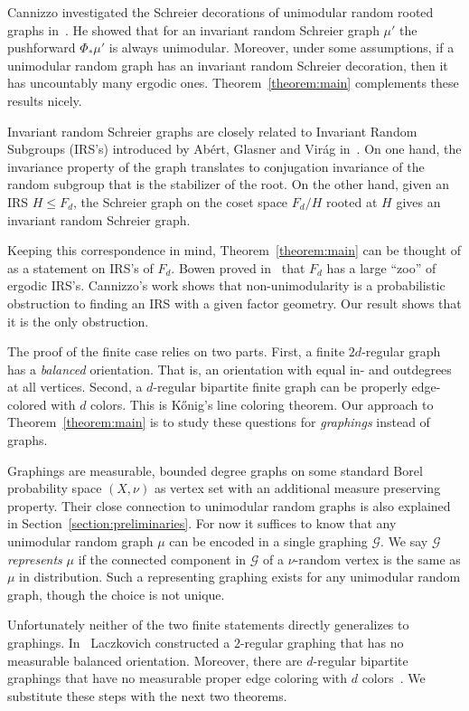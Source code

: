 \documentclass[11pt]{article}
\theoremstyle{definition}
\numberwithin{equation}{section}
\numberwithin{figure}{section}
\numberwithin{table}{section}
\newcommand{\G}{\mathcal{G}}
\begin{document}

Cannizzo investigated the Schreier decorations of unimodular random rooted graphs in~\cite{cannizzo2013invariant}. He showed that for an invariant random Schreier graph $\mu'$ the pushforward $\Phi_{*} \mu'$ is always unimodular. Moreover, under some assumptions, if a unimodular random graph has an invariant random Schreier decoration, then it has uncountably many ergodic ones. Theorem~\ref{theorem:main} complements these results nicely.

Invariant random Schreier graphs are closely related to Invariant Random Subgroups (IRS's) introduced by Abért, Glasner and Virág in~\cite{abert2014kesten}. On one hand, the invariance property of the graph translates to conjugation invariance of the random subgroup that is the stabilizer of the root. On the other hand, given an IRS $H \leq F_d$, the Schreier graph on the coset space $F_d/H$ rooted at $H$ gives an invariant random Schreier graph.

Keeping this correspondence in mind, Theorem~\ref{theorem:main} can be thought of as a statement on IRS's of $F_d$. Bowen proved in~\cite{bowen2012invariant} that $F_d$ has a large ``zoo'' of ergodic IRS's. Cannizzo's work shows that non-unimodularity is a probabilistic obstruction to finding an IRS with a given factor geometry. Our result shows that it is the only obstruction.

The proof of the finite case relies on two parts. First, a finite $2d$-regular graph has a \emph{balanced} orientation. That is, an orientation with equal in- and outdegrees at all vertices. Second, a $d$-regular bipartite finite graph can be properly edge-colored with $d$ colors. This is K{\H o}nig's line coloring theorem. Our approach to Theorem~\ref{theorem:main} is to study these questions for \emph{graphings} instead of graphs.

Graphings are measurable, bounded degree graphs on some standard Borel probability space $(X,\nu)$ as vertex set with an additional measure preserving property. Their close connection to unimodular random graphs is also explained in Section~\ref{section:preliminaries}. For now it suffices to know that any unimodular random graph $\mu$ can be encoded in a single graphing $\G$. We say $\G$ \emph{represents} $\mu$ if the connected component in $\G$ of a $\nu$-random vertex is the same as $\mu$ in distribution. Such a representing graphing exists for any unimodular random graph, though the choice is not unique.

Unfortunately neither of the two finite statements directly generalizes to graphings. In~\cite{laczkovich1988closed} Laczkovich constructed a $2$-regular graphing that has no measurable balanced orientation. Moreover, there are $d$-regular bipartite graphings that have no measurable proper edge coloring with $d$ colors~\cite[Section~6]{conley2013measurable}. We substitute these steps with the next two theorems.
\end{document}
